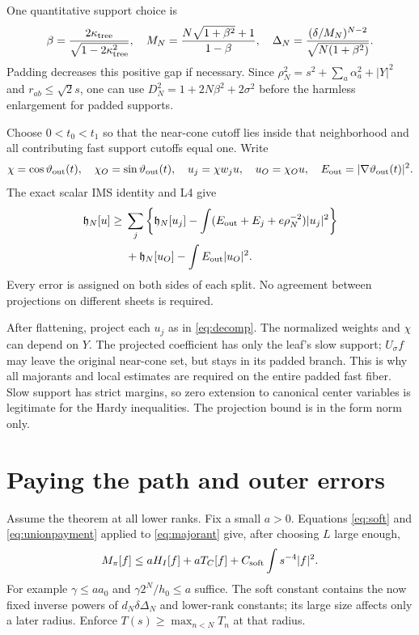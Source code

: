 \documentclass[11pt,letterpaper]{article}
\theoremstyle{definition}\newtheorem{hypothesis}[theorem]{Hypothesis}
\newcommand{\hh}{\mathfrak h}
\numberwithin{equation}{section}
\begin{document}
One quantitative support choice is
\begin{equation}
 \beta=\frac{2\kappa_{\rm tree}}{\sqrt{1-2\kappa_{\rm tree}^2}},\quad
 M_N=\frac{N\sqrt{1+\beta^2}+1}{1-\beta},\quad
 \Delta_N=\frac{(\delta/M_N)^{N-2}}{\sqrt{N(1+\beta^2)}}.
\end{equation}
Padding decreases this positive gap if necessary. Since
$\rho_N^2=s^2+\sum_a\alpha_a^2+|Y|^2$ and $r_{ab}\le\sqrt2s$, one can use $D_N^2=1+2N\beta^2+2\sigma^2$ before the harmless enlargement for padded supports.

Choose $0<t_0<t_1$ so that the near-cone cutoff lies inside that neighborhood and all contributing fast support cutoffs equal one. Write
\begin{equation}
 \chi=\cos\vartheta_{\rm out}(t),\quad
 \chi_O=\sin\vartheta_{\rm out}(t),\quad
 u_j=\chi w_ju,\quad u_O=\chi_Ou,\quad
 E_{\rm out}=|\nabla\vartheta_{\rm out}(t)|^2.
\end{equation}
The exact scalar IMS identity and L4 give
\begin{align}
 \hh_N[u]\ge{}&\sum_j\left\{\hh_N[u_j]
 -\int(E_{\rm out}+E_j+e\rho_N^{-2})|u_j|^2\right\}\nonumber\\
 &+\hh_N[u_O]-\int E_{\rm out}|u_O|^2.\label{eq:globalims}
\end{align}
Every error is assigned on both sides of each split. No agreement between projections on different sheets is required.

After flattening, project each $u_j$ as in \eqref{eq:decomp}. The normalized weights and $\chi$ can depend on $Y$. The projected coefficient has only the leaf's slow support; $U_\sigma f$ may leave the original near-cone set, but stays in its padded branch. This is why all majorants and local estimates are required on the entire padded fast fiber. Slow support has strict margins, so zero extension to canonical center variables is legitimate for the Hardy inequalities. The projection bound is in the form norm only.

\section{Paying the path and outer errors}
Assume the theorem at all lower ranks. Fix a small $a>0$. Equations \eqref{eq:soft} and \eqref{eq:unionpayment} applied to \eqref{eq:majorant} give, after choosing $L$ large enough,
\begin{equation}
 M_\pi[f]\le aH_I[f]+aT_C[f]+C_{\rm soft}\int s^{-4}|f|^2.\label{eq:pathlow}
\end{equation}
For example $\gamma\le aa_0$ and $\gamma2^N/h_0\le a$ suffice. The soft constant contains the now fixed inverse powers of $d_N\delta\Delta_N$ and lower-rank constants; its large size affects only a later radius. Enforce $T(s)\ge\max_{n<N}T_n$ at that radius.
\end{document}
